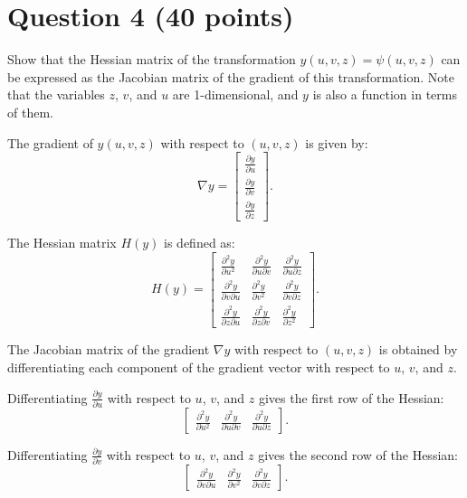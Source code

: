 \section{Question 4 (40 points)}
Show that the Hessian matrix of the transformation \( y(u, v, z) = \psi(u, v, z) \) can be expressed as the Jacobian matrix of the gradient of this transformation. Note that the variables \( z \), \( v \), and \( u \) are 1-dimensional, and \( y \) is also a function in terms of them.
\begin{qsolve}
	\begin{qsolve}[]		
      The gradient of \( y(u, v, z) \) with respect to \( (u, v, z) \) is given by:
      \[
      \nabla y = \begin{bmatrix} \frac{\partial y}{\partial u} \\ \frac{\partial y}{\partial v} \\ \frac{\partial y}{\partial z} \end{bmatrix}.
      \]
      
      The Hessian matrix \( H(y) \) is defined as:
      \[
      H(y) = \begin{bmatrix}
      \frac{\partial^2 y}{\partial u^2} & \frac{\partial^2 y}{\partial u \partial v} & \frac{\partial^2 y}{\partial u \partial z} \\
      \frac{\partial^2 y}{\partial v \partial u} & \frac{\partial^2 y}{\partial v^2} & \frac{\partial^2 y}{\partial v \partial z} \\
      \frac{\partial^2 y}{\partial z \partial u} & \frac{\partial^2 y}{\partial z \partial v} & \frac{\partial^2 y}{\partial z^2}
      \end{bmatrix}.
      \]
      
      The Jacobian matrix of the gradient \( \nabla y \) with respect to \( (u, v, z) \) is obtained by differentiating each component of the gradient vector with respect to \( u \), \( v \), and \( z \).
      
      Differentiating \( \frac{\partial y}{\partial u} \) with respect to \( u \), \( v \), and \( z \) gives the first row of the Hessian:
      \[
      \begin{bmatrix} \frac{\partial^2 y}{\partial u^2} & \frac{\partial^2 y}{\partial u \partial v} & \frac{\partial^2 y}{\partial u \partial z} \end{bmatrix}.
      \]
      
      Differentiating \( \frac{\partial y}{\partial v} \) with respect to \( u \), \( v \), and \( z \) gives the second row of the Hessian:
      \[
      \begin{bmatrix} \frac{\partial^2 y}{\partial v \partial u} & \frac{\partial^2 y}{\partial v^2} & \frac{\partial^2 y}{\partial v \partial z} \end{bmatrix}.
      \]
      

\end{qsolve}
\end{qsolve}

